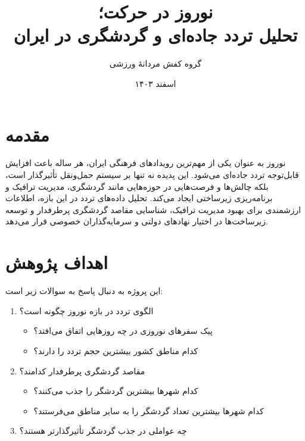 \documentclass[a4paper, 12pt]{article}
\begin{document}
\title{نوروز در حرکت؛\\ تحلیل تردد جاده‌ای و گردشگری در ایران}
\author{گروه کفش مردانهٔ ورزشی}
\date{اسفند ۱۴۰۳}
\maketitle

\section{مقدمه}
نوروز به عنوان یکی از مهم‌ترین رویدادهای فرهنگی ایران، هر ساله باعث افزایش قابل‌توجه تردد جاده‌ای می‌شود. این پدیده نه تنها بر سیستم حمل‌ونقل تأثیرگذار است، بلکه چالش‌ها و فرصت‌هایی در حوزه‌هایی مانند گردشگری، مدیریت ترافیک و برنامه‌ریزی زیرساختی ایجاد می‌کند. تحلیل داده‌های تردد در این بازه، اطلاعات ارزشمندی برای بهبود مدیریت ترافیک، شناسایی مقاصد گردشگری پرطرفدار و توسعه زیرساخت‌ها در اختیار نهادهای دولتی و سرمایه‌گذاران خصوصی قرار می‌دهد.

\section{اهداف پژوهش}
این پروژه به دنبال پاسخ به سوالات زیر است:
\begin{enumerate}
    \item الگوی تردد در بازه نوروز چگونه است؟
        \begin{itemize}
            \item پیک سفرهای نوروزی در چه روزهایی اتفاق می‌افتد؟
            \item کدام مناطق کشور بیشترین حجم تردد را دارند؟
        \end{itemize}
    \item مقاصد گردشگری پرطرفدار کدامند؟
        \begin{itemize}
            \item کدام شهرها بیشترین گردشگر را جذب می‌کنند؟
            \item کدام شهرها بیشترین تعداد گردشگر را به سایر مناطق می‌فرستند؟
        \end{itemize}
    \item چه عواملی در جذب گردشگر تأثیرگذارتر هستند؟
\end{enumerate}
\end{document}
